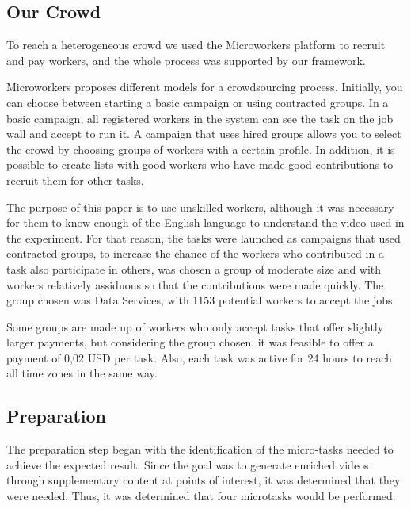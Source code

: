 \subsection{Our Crowd}
To reach a heterogeneous crowd we used the Microworkers platform to recruit and pay workers, and the whole process was supported by our framework.

Microworkers proposes different models for a crowdsourcing process. Initially, you can choose between starting a basic campaign or using contracted groups. In a basic campaign, all registered workers in the system can see the task on the job wall and accept to run it. A campaign that uses hired groups allows you to select the crowd by choosing groups of workers with a certain profile. In addition, it is possible to create lists with good workers who have made good contributions to recruit them for other tasks. 

The purpose of this paper is to use unskilled workers, although it was necessary for them to know enough of the English language to understand the video used in the experiment. For that reason, the tasks were launched as campaigns that used contracted groups, to increase the chance of the workers who contributed in a task also participate in others, was chosen a group of moderate size and with workers relatively assiduous so that the contributions were made quickly. The group chosen was Data Services, with 1153 potential workers to accept the jobs.

Some groups are made up of workers who only accept tasks that offer slightly larger payments, but considering the group chosen, it was feasible to offer a payment of 0,02 USD per task. Also, each task was active for 24 hours to reach all time zones in the same way.

\subsection{Preparation}

The preparation step began with the identification of the micro-tasks needed to achieve the expected result. Since the goal was to generate enriched videos through supplementary content at points of interest, it was determined that they were needed. Thus, it was determined that four microtasks would be performed:

